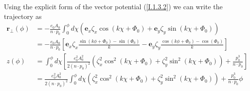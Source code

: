 Using the explicit form of the vector potential (\ref{I.1.3.2}) we can write the trajectory as
\begin{align}
  \mathbf{r}_{\perp}(\phi) & =-\frac{e_{0} A_{0}}{n \cdot p_{0}} \int_{0}^{\phi} d \chi\left(\mathbf{e}_{x} \zeta_{x} \cos \left(k \chi+\Phi_{0}\right)+\mathbf{e}_{y} \zeta_{y} \sin \left(k \chi+\Phi_{0}\right)\right)\nonumber                                                        \\
                           & = -\frac{e_{0} A_{0}}{n \cdot p_{0}}\left[\mathbf{e}_{x} \zeta_{x} \frac{\sin \left(k \phi+\Phi_{0}\right)-\sin \left(\Phi_{0}\right)}{k}-\mathbf{e}_{y} \zeta_{y} \frac{\cos \left(k \phi+\Phi_{0}\right)-\cos \left(\Phi_{0}\right)}{k}\right]             \\
  z(\phi)                  & =\int_{0}^{\phi} d \chi\left[\frac{e_{0}^{2} A_{0}^{2}}{2\left(n \cdot p_{0}\right)^{2}}\left(\zeta_{x}^{2} \cos ^{2}\left(k \chi+\Phi_{0}\right)+\zeta_{y}^{2} \sin ^{2}\left(k \chi+\Phi_{0}\right)\right)+\frac{p_{0}^{3}}{n \cdot p_{0}}\right]\nonumber \\
                           & = \frac{e_{0}^{2} A_{0}^{2}}{2\left(n \cdot p_{0}\right)^{2}} \int_{0}^{\phi} d \chi\left(\zeta_{x}^{2} \cos ^{2}\left(k \chi+\Phi_{0}\right)+\zeta_{y}^{2} \sin ^{2}\left(k \chi+\Phi_{0}\right)\right)+ \frac{p_{0}^{3}}{n \cdot p_{0}}\phi
\end{align}
